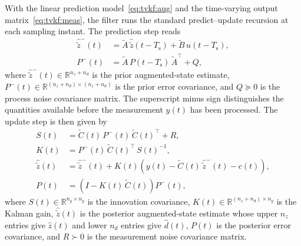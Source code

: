 \documentclass[preprint,12pt,authoryear]{elsarticle}
\theoremstyle{remark}
\begin{document}
With the linear prediction model~\eqref{eq:tvkf:aug} and the time-varying output
matrix~\eqref{eq:tvkf:meas}, the filter runs the standard predict--update recursion at each
sampling instant. The prediction step reads
\begin{subequations}
  \label{eq:tvkf:predict}
  \begin{align}
    \hat{\tilde{z}}^{-}(t) &= \tilde{A}\,\hat{\tilde{z}}(t-T_\text{s}) + \tilde{B}\,u(t-T_\text{s}), \label{eq:tvkf:predict:z} \\
    P^{-}(t) &= \tilde{A}\,P(t-T_\text{s})\,\tilde{A}^\intercal + Q, \label{eq:tvkf:predict:P}
  \end{align}
\end{subequations}
where $\hat{\tilde{z}}^{-}(t) \in \mathbb{R}^{n_z+n_d}$ is the prior augmented-state estimate,
$P^{-}(t) \in \mathbb{R}^{(n_z+n_d)\times(n_z+n_d)}$ is the prior error covariance, and
$Q \succeq 0$ is the process noise covariance matrix. The superscript minus sign distinguishes the quantities available before the measurement $y(t)$ has been processed. The update step is then given by
\begin{subequations}
  \label{eq:tvkf:update}
  \begin{align}
    S(t) &= \tilde{C}(t)\,P^{-}(t)\,\tilde{C}(t)^\intercal + R, \label{eq:tvkf:update:S} \\
    K(t) &= P^{-}(t)\,\tilde{C}(t)^\intercal\,S(t)^{-1}, \label{eq:tvkf:update:K} \\
    \hat{\tilde{z}}(t) &= \hat{\tilde{z}}^{-}(t) + K(t)\!\left(y(t) - \tilde{C}(t)\,\hat{\tilde{z}}^{-}(t) - c(t)\right), \label{eq:tvkf:update:z} \\
    P(t) &= \left(I - K(t)\,\tilde{C}(t)\right)P^{-}(t), \label{eq:tvkf:update:P}
  \end{align}
\end{subequations}
where $S(t) \in \mathbb{R}^{n_y \times n_y}$ is the innovation covariance, $K(t) \in \mathbb{R}^{(n_z+n_d)\times n_y}$ is the Kalman gain, $\hat{\tilde{z}}(t)$ is the posterior augmented-state estimate whose upper $n_z$ entries give $\hat{z}(t)$ and lower $n_d$ entries give $\hat{d}(t)$, $P(t)$ is the posterior error covariance, and $R \succ 0$ is the measurement noise covariance matrix.
\end{document}
